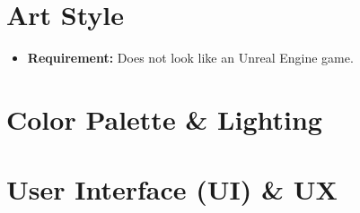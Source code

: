 \section{Art Style}

\begin{itemize}
	\item \textbf{Requirement:} Does not look like an Unreal Engine game.
\end{itemize}

\lipsum[21]

\section{Color Palette \& Lighting}

\lipsum[22]

\section{User Interface (UI) \& UX}

\lipsum[23]